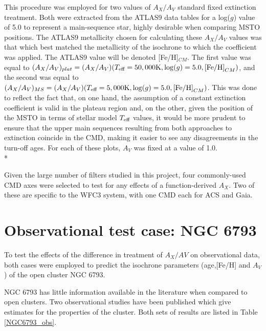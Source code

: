 \documentclass[12pt, a4paper]{report}
\begin{document}
This procedure was employed for two values of $A_{X}/A_{V}$ standard fixed extinction treatment. Both were extracted from the ATLAS9 data tables for a log($g$) value of 5.0 to represent a main-sequence star, highly desirable when comparing MSTO positions. The ATLAS9 metallicity chosen for calculating these $A_{X}/A_{V}$ values was that which best matched the metallicity of the isochrone to which the coefficient was applied. The ATLAS9 value will be denoted [Fe/H]$_{CM}$. The first value was equal to $(A_{X}/A_{V})_{plat} = (A_{X}/A_{V})(T_{\textnormal{eff}} = 50,000\textnormal{K},\log(g) = 5.0,\textnormal{[Fe/H]}_{CM})$, and the second was equal to $(A_{X}/A_{V})_{MS} = (A_{X}/A_{V})(T_{\textnormal{eff}} = 5,000\textnormal{K},\log(g) = 5.0,\textnormal{[Fe/H]}_{CM})$. This was done to reflect the fact that, on one hand, the assumption of a constant extinction coefficient is valid in the plateau region and, on the other, given the position of the MSTO in terms of stellar model $T_{\textnormal{eff}}$ values, it would be more prudent to ensure that the upper main sequences resulting from both approaches to extinction coincide in the CMD, making it easier to see any disagreements in the turn-off ages. For each of these plots, $A_{V}$ was fixed at a value of 1.0.\\*

Given the large number of filters studied in this project, four commonly-used CMD axes were selected to test for any effects of a function-derived $A_{X}$. Two of these are specific to the WFC3 system, with one CMD each for ACS and Gaia.

\section{Observational test case: NGC 6793}
To test the effects of the difference in treatment of $A_{X}/A{V}$ on observational data, both cases were employed to predict the isochrone parameters (age,[Fe/H] and $A_{V}$) of the open cluster NGC 6793.

NGC 6793 has little information available in the literature when compared to open clusters. Two observational studies have been published which give estimates for the properties of the cluster. Both sets of results are listed in Table \ref{NGC6793_obs}.
\end{document}
